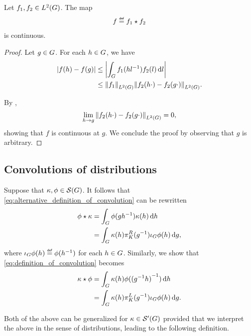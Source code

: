 \begin{lemma}
    Let $f_1, f_2 \in \Lebesgue 2 \Group$.
    The map
    \begin{align*}
        f \defeq \conv {f_1} {f_2}
    \end{align*}
    is continuous.
\end{lemma}
\begin{proof}
    Let $g \in \Group$.
    For each $h \in \Group$,
    we have
    \begin{align*}
        \abs {f(h) - f(g)} &\leq \abs {\int_\Group f_1(h l^{-1}) f_2(l) \dd l}\\
        &\leq \norm [\Lebesgue 2 \Group] {f_1} \norm [\Lebesgue 2 \Group] {f_2(h \dummy) - f_2(g \dummy)}.
    \end{align*}

    By \cite[Lemma 4.3.8]{Willem2013},
    \begin{align*}
        \lim_{h \to g} \norm [\Lebesgue 2 \Group] {f_2(h \dummy) - f_2(g \dummy)} = 0,
    \end{align*}
    showing that $f$ is continuous at $g$.
    We conclude the proof by observing that $g$ is arbitrary.
\end{proof}

\subsection{Convolutions of distributions}

Suppose that $\kappa, \phi \in \Schwartz \Group$.
It follows that \eqref{eq:alternative_definition_of_convolution} can be rewritten
\begin{align*}
    \conv \phi \kappa &= \int_\Group \phi(g h^{-1}) \kappa(h) \dd h\\
    &= \int_\Group \kappa(h) \RightRegularRepresentation(g^{-1}) \InverseFunctionArgument \phi(h) \dd g,
\end{align*}
where $\InverseFunctionArgument \phi(h) \defeq \phi(h^{-1})$ for each $h \in \Group$.
Similarly, we show that \eqref{eq:definition_of_convolution} becomes
\begin{align*}
    \conv \kappa \phi &= \int_\Group \kappa(h) \phi({(g^{-1} h)}^{-1}) \dd h\\
    &= \int_\Group \kappa(h) \LeftRegularRepresentation(g^{-1}) \InverseFunctionArgument \phi(h) \dd g.
\end{align*}

Both of the above can be generalized for $\kappa \in \TemperedDistributions \Group$
provided that we interpret the above in the sense of distributions,
leading to the following definition.


